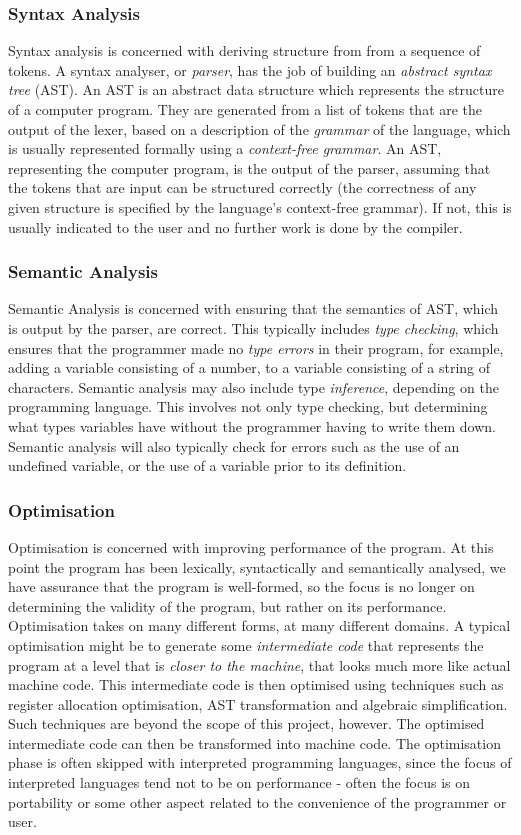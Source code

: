 \documentclass{article}
\begin{document}
\subsubsection{Syntax Analysis}
Syntax analysis is concerned with deriving structure from from a sequence of tokens. A syntax analyser, or \emph{parser}, has the job of building an \emph{abstract syntax tree} (AST). An AST is an abstract data structure which represents the structure of a computer program. They are generated from a list of tokens that are the output of the lexer, based on a description of the \emph{grammar} of the language, which is usually represented formally using a \emph{context-free grammar}. An AST, representing the computer program, is the output of the parser, assuming that the tokens that are input can be structured correctly (the correctness of any given structure is specified by the language's context-free grammar). If not, this is usually indicated to the user and no further work is done by the compiler.

\subsubsection{Semantic Analysis}
Semantic Analysis is concerned with ensuring that the semantics of AST, which is output by the parser, are correct. This typically includes \emph{type checking}, which ensures that the programmer made no \emph{type errors} in their program, for example, adding a variable consisting of a number, to a variable consisting of a string of characters. Semantic analysis may also include type \emph{inference}, depending on the programming language. This involves not only type checking, but determining what types variables have without the programmer having to write them down. Semantic analysis will also typically check for errors such as the use of an undefined variable, or the use of a variable prior to its definition.

\subsubsection{Optimisation}
Optimisation is concerned with improving performance of the program. At this point the program has been lexically, syntactically and semantically analysed, we have assurance that the program is well-formed, so the focus is no longer on determining the validity of the program, but rather on its performance. Optimisation takes on many different forms, at many different domains. A typical optimisation might be to generate some \emph{intermediate code} that represents the program at a level that is \emph{closer to the machine}, that looks much more like actual machine code. This intermediate code is then optimised using techniques such as register allocation optimisation, AST transformation and algebraic simplification. Such techniques are beyond the scope of this project, however. The optimised intermediate code can then be transformed into machine code.
\indent The optimisation phase is often skipped with interpreted programming languages, since the focus of interpreted languages tend not to be on performance - often the focus is on portability or some other aspect related to the convenience of the programmer or user.
\end{document}
